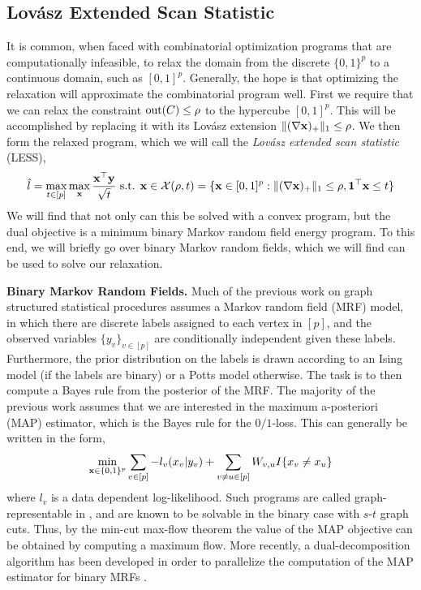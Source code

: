 \subsection{Lov\'asz Extended Scan Statistic}
\label{sec:less}
\vspace{-.1cm}
It is common, when faced with combinatorial optimization programs that are computationally infeasible, to relax the domain from the discrete $\{0,1\}^p$ to a continuous domain, such as $[0,1]^p$.
Generally, the hope is that optimizing the relaxation will approximate the combinatorial program well.
First we require that we can relax the constraint $\textrm{out}(C) \le \rho$ to the hypercube $[0,1]^p$.
This will be accomplished by replacing it with its Lov\'asz extension $\|(\nabla \mathbf{x})_+ \|_1 \le \rho$.
We then form the relaxed program, which we will call the {\em Lov\'asz extended scan statistic} (LESS), 
\begin{equation}
\label{eq:less}
\hat l = \max_{t \in [p]} \max_{\mathbf{x}} \frac{\mathbf{x}^\top \mathbf{y}}{\sqrt{t}} \textrm{ s.t. } \mathbf{x} \in \mathcal{X}(\rho,t) = \{ \mathbf{x} \in [0,1]^p : \| (\nabla \mathbf{x})_+ \|_1 \le \rho, {\bf 1}^\top \mathbf{x} \le t \}
\end{equation}
We will find that not only can this be solved with a convex program, but the dual objective is a minimum binary Markov random field energy program.
To this end, we will briefly go over binary Markov random fields, which we will find can be used to solve our relaxation.

{\bf Binary Markov Random Fields.} Much of the previous work on graph structured statistical procedures assumes a Markov random field (MRF) model, in which there are discrete labels assigned to each vertex in $[p]$, and the observed variables $\{y_v\}_{v \in [p]}$ are conditionally independent given these labels.
Furthermore, the prior distribution on the labels is drawn according to an Ising model (if the labels are binary) or a Potts model otherwise. 
The task is to then compute a Bayes rule from the posterior of the MRF.
The majority of the previous work assumes that we are interested in the maximum a-posteriori (MAP) estimator, which is the Bayes rule for the $0/1$-loss.
This can generally be written in the form,
\[
\min_{\mathbf{x} \in \{0,1\}^p} \sum_{v \in [p]} -l_v(x_v | y_v) + \sum_{v \ne u \in [p]} W_{v,u} I\{ x_v \ne x_u\}
\]
where $l_v$ is a data dependent log-likelihood.
Such programs are called graph-representable in \cite{kolmogorov2004energy}, and are known to be solvable in the binary case with $s$-$t$ graph cuts.
Thus, by the min-cut max-flow theorem the value of the MAP objective can be obtained by computing a maximum flow.
More recently, a dual-decomposition algorithm has been developed in order to parallelize the computation of the MAP estimator for binary MRFs \cite{strandmark2010parallel,sontag2011introduction}.


